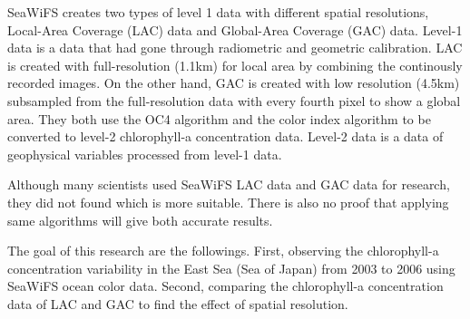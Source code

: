 SeaWiFS creates two types of level 1 data with different spatial resolutions, Local-Area Coverage (LAC) data and Global-Area Coverage (GAC) data. Level-1 data is a data that had gone through radiometric and geometric calibration. LAC is created with full-resolution (1.1km) for local area by combining the continously recorded images. On the other hand, GAC is created with low resolution (4.5km) subsampled from the full-resolution data with every fourth pixel to show a global area. They both use the OC4 algorithm and the color index algorithm to be converted to level-2 chlorophyll-a concentration data. Level-2 data is a data of geophysical variables processed from level-1 data. 

Although many scientists used SeaWiFS LAC data and GAC data for research, they did not found which is more suitable. There is also no proof that applying same algorithms will give both accurate results. 

The goal of this research are the followings. First, observing the chlorophyll-a concentration variability in the East Sea (Sea of Japan) from 2003 to 2006 using SeaWiFS ocean color data. Second, comparing the chlorophyll-a concentration data of LAC and GAC to find the effect of spatial resolution.

